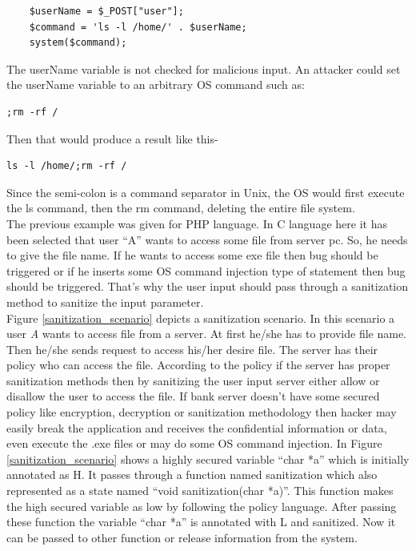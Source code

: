 \begin{lstlisting}
	$userName = $_POST["user"];
	$command = 'ls -l /home/' . $userName;
	system($command);
\end{lstlisting} 

The userName variable is not checked for malicious input. An attacker could set the userName variable to an arbitrary OS command such as:
\begin{lstlisting}
;rm -rf /
\end{lstlisting}
Then that would produce a result like this-
\begin{lstlisting}
ls -l /home/;rm -rf /
\end{lstlisting}
Since the semi-colon is a command separator in Unix, the OS would first execute the ls command, then the rm command, deleting the entire file system.\\

The previous example was given for PHP language. In C language here it has been selected that user \enquote{A} wants to access some file from server pc. So, he needs to give the file name. If he wants to access some exe file then bug should be triggered or if he inserts some OS command injection type of statement then bug should be triggered. That's why the user input should pass through a sanitization method to sanitize the input parameter.\\

 Figure \ref{sanitization_scenario} depicts a sanitization scenario. In this scenario a user \emph{A} wants to access file from a server. At first he/she has to provide file name. Then he/she sends request to access his/her desire file. The server has their policy who can access the file. According to the policy if the server has proper sanitization methods then by sanitizing the user input server either allow or disallow the user to access the file. If bank server doesn't have some secured policy like encryption, decryption or sanitization methodology then hacker may easily break the application and receives the confidential information or data, even execute the .exe files or may do some OS command injection. In Figure \ref{sanitization_scenario} shows a highly secured variable \enquote{char *a} which is initially annotated as H. It passes through a function named sanitization which also represented as a state named \enquote{void sanitization(char *a)}. This function makes the high secured variable as low by following the policy language. After passing these function the variable \enquote{char *a} is annotated with L and sanitized. Now it can be passed to other function or release information from the system.

